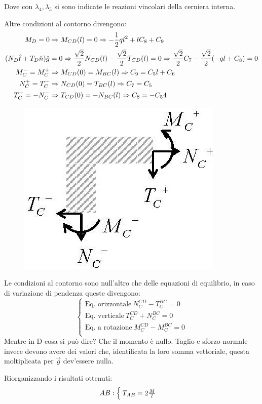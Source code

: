 \documentclass{article}
\begin{document}
\begin{adjustwidth}{2in}{}
	Dove con $\lambda_4, \lambda_5$ si sono indicate le reazioni vincolari della cerniera interna. \newline 
	
	Altre condizioni al contorno divengono: 
	\[
	\begin{split}
		M_D= 0 & \Rightarrow M_{CD} (l)= 0 \Rightarrow -{1\over2}ql^2 + lC_8 + C_9 \\
		(N_D\hat{t} + T_D\hat{n})\hat{g} & = 0 \Rightarrow {\sqrt{2}\over2}N_{CD}(l)-{\sqrt{2}\over2}T_{CD}(l)=0 \Rightarrow {\sqrt{2}\over2}C_7-{\sqrt{2}\over2}(-ql+C_8)=0 \\
		M^-_C= M^+_C & \Rightarrow M_{CD} (0)= M_{BC}(l) \Rightarrow C_9 = C_5l+C_6 \\
		N^+_C= T^-_C & \Rightarrow N_{CD} (0)= T_{BC}(l) \Rightarrow C_7 = C_5 \\
		T^+_C= -N^-_C & \Rightarrow T_{CD} (0)= -N_{BC}(l) \Rightarrow C_8 = -C_54 \\
	\end{split} \]
\begin{figure}[H]
	\centering
	\includegraphics[width=0.3\linewidth]{"immagini/1.PARTE5_Pagina_26"}
\end{figure}
	Le condizioni al contorno sono null'altro che delle equazioni di equilibrio, in caso di variazione di pendenza queste divengono:
	\[\begin{cases}
		\text{Eq. orizzontale} ~ N_C^{CD} - T_C^{BC} = 0 \\
		\text{Eq. verticale} ~ T_C^{CD} + N_C^{BC} = 0 \\
		\text{Eq. a rotazione} ~ M_C^{CD} - M_C^{BC} = 0 \\
	\end{cases}\]
Mentre in D cosa si può dire? Che il momento è nullo. Taglio e sforzo normale invece devono avere dei valori che, identificata la loro somma vettoriale, questa moltiplicata per $\vec{g}$ dev'essere nulla. \newline
	
	Riorganizzando i risultati ottenuti:
	\[
	AB: \begin{cases}
		T_{AB} = 2{M\over l} \\
		

\end{cases}\]
\end{adjustwidth}
\end{document}
